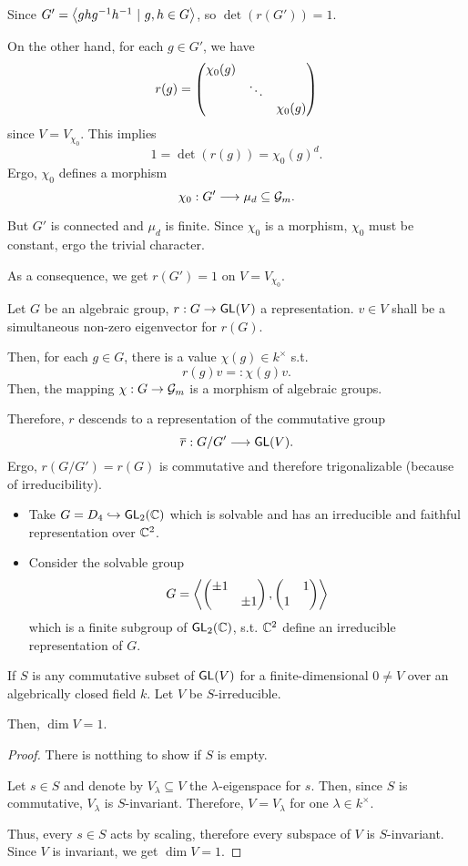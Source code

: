 Since $G' = \left<ghg^{-1} h^{-1} ~|~ g,h \in G\right>$, so $\det(r(G')) = 1$.

On the other hand, for each $g \in G'$, we have
\[
r(g) = \left(\begin{matrix} 
\chi_0(g) \\
& \ddots \\
 & & \chi_0(g)
 \end{matrix}\right)
\]
since $V = V_{\chi_0}$. This implies
\[ 1 = \det(r(g)) = \chi_0(g)^d. \]
Ergo, $\chi_0$ defines a morphism
\[ \chi_0 : G' \overset{}{\longrightarrow} \mu_d \subseteq \mathcal{G}_m. \]

But $G'$ is connected and $\mu_d$ is finite. Since $\chi_0$ is a morphism, $\chi_0$ must be constant, ergo the trivial character.

As a consequence, we get $r(G') = 1$ on $V = V_{\chi_0}$.

\begin{lemma}
	Let $G$ be an algebraic group, $r : G \overset{}{\rightarrow} \textsf{GL}(V)$ a representation. $v \in V$ shall be a simultaneous non-zero eigenvector for $r(G)$.
	
	Then, for each $g \in G$, there is a value $\chi(g) \in k^\times$ s.t.
	\[ r(g) v =: \chi(g)v. \]
	Then, the mapping $\chi : G \overset{}{\rightarrow} \mathcal{G}_m$ is a morphism of algebraic groups.
\end{lemma}

Therefore, $r $ descends to a representation of the commutative group
\[ \overline{r} : G / G' \overset{}{\longrightarrow} \textsf{GL}(V). \]
Ergo, $r(G / G') = r(G)$ is commutative and therefore trigonalizable (because of irreducibility). \qedsymbol


\begin{example}
\begin{itemize}
	\item Take $ G = D_4 \overset{}{\hookrightarrow} \textsf{GL}_2(\mathbb{C})$ which is solvable and has an irreducible and faithful representation over $\mathbb{C}^2$. 
	\item Consider the solvable group
	\[ G = \left<\left(\begin{matrix} \pm 1 \\ & \pm 1 \end{matrix}\right), \left(\begin{matrix} & 1 \\ 1 \end{matrix}\right)\right> \]
	which is a finite subgroup of $\textsf{GL}_2(\mathbb{C})$, s.t. $\mathbb{C}^2$ define an irreducible representation of $G$.
\end{itemize}
\end{example}

\begin{lemma}
	If $S$ is any commutative subset of $\textsf{GL}(V)$ for a finite-dimensional $0\neq V$ over an algebrically closed field $k$. Let $V$ be $S$-irreducible.
	
	Then, $\dim V = 1$.
\end{lemma}
\begin{proof}
	There is notthing to show if $S$ is empty.
	
	Let $s \in S$ and denote by $V_\lambda \subseteq V $ the $\lambda$-eigenspace for $s$. Then, since $S$ is commutative, $V_\lambda$ is $S$-invariant. Therefore, $V = V_\lambda$ for one $\lambda \in k^\times$.
	
	Thus, every $s \in S$ acts by scaling, therefore every subspace of $V$ is $S$-invariant. Since $V$ is invariant, we get $\dim V = 1$.
\end{proof}


